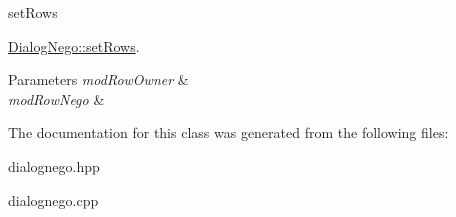 set\+Rows 

\hyperlink{classDialogNego_ad98c2abab579325665c3b2f615aeb08c}{Dialog\+Nego\+::set\+Rows}.


\begin{DoxyParams}{Parameters}
{\em mod\+Row\+Owner} & \\
\hline
{\em mod\+Row\+Nego} & \\
\hline
\end{DoxyParams}


The documentation for this class was generated from the following files\+:\begin{DoxyCompactItemize}
\item 
dialognego.\+hpp\item 
dialognego.\+cpp\end{DoxyCompactItemize}
